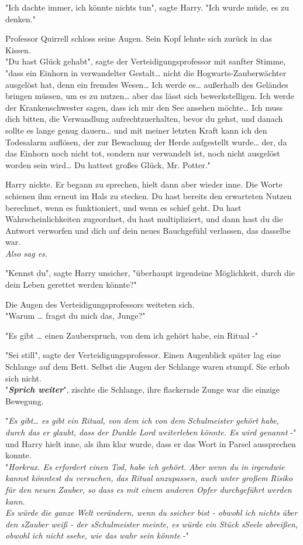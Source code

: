 {"Ich dachte immer, ich könnte nichts tun", sagte Harry. "Ich wurde müde, es zu denken."

Professor Quirrell schloss seine Augen. Sein Kopf lehnte sich zurück in das Kissen.\\ "Du hast Glück gehabt", sagte der Verteidigungsprofessor mit sanfter Stimme,\\ "dass ein Einhorn in verwandelter Gestalt… nicht die Hogwarts-Zauberwächter ausgelöst hat, denn ein fremdes Wesen… Ich werde es… außerhalb des Geländes bringen müssen, um es zu nutzen… aber das lässt sich bewerkstelligen. Ich werde der Krankenschwester sagen, dass ich mir den See ansehen möchte… Ich muss dich bitten, die Verwandlung aufrechtzuerhalten, bevor du gehst, und danach sollte es lange genug dauern… und mit meiner letzten Kraft kann ich den Todesalarm auflösen, der zur Bewachung der Herde aufgestellt wurde… der, da das Einhorn noch nicht tot, sondern nur verwandelt ist, noch nicht ausgelöst worden sein wird… Du hattest großes Glück, Mr. Potter."

Harry nickte. Er begann zu sprechen, hielt dann aber wieder inne. Die Worte schienen ihm erneut im Hals zu stecken. Du hast bereits den erwarteten Nutzen berechnet, wenn es funktioniert, und wenn es schief geht. Du hast Wahrscheinlichkeiten zugeordnet, du hast multipliziert, und dann hast du die Antwort verworfen und dich auf dein neues Bauchgefühl verlassen, das dasselbe war.\\ \emph{Also sag es.}

"Kennst du", sagte Harry unsicher, "überhaupt irgendeine Möglichkeit, durch die dein Leben gerettet werden könnte?"

Die Augen des Verteidigungsprofessors weiteten sich.\\ "Warum … fragst du mich das, Junge?"

"Es gibt … einen Zauberspruch, von dem ich gehört habe, ein Ritual -"

"Sei still", sagte der Verteidigungsprofessor. Einen Augenblick später lag eine Schlange auf dem Bett. Selbst die Augen der Schlange waren stumpf. Sie erhob sich nicht.\\ "\textbf{\emph{Sprich weiter}}", zischte die Schlange, ihre flackernde Zunge war die einzige Bewegung.

"\emph{Es gibt… es gibt ein Ritual, von dem ich von dem Schulmeister gehört habe, durch das er glaubt, dass der Dunkle Lord weiterleben könnte. Es wird genannt} -" und Harry hielt inne, als ihm klar wurde, dass er das Wort in Parsel aussprechen konnte.\\ "\emph{Horkrux. Es erfordert einen Tod, habe ich gehört. Aber wenn du in irgendwie kannst könntest du versuchen, das Ritual anzupassen, auch unter großem Risiko für den neuen Zauber, so dass es mit einem anderen Opfer durchgeführt werden kann.\\ Es würde die ganze Welt verändern, wenn du ssicher bist - obwohl ich nichts über den sZauber weiß - der sSchulmeister meinte, es würde ein Stück sSeele abreißen, obwohl ich nicht ssehe, wie das wahr sein könnte} -"

}
